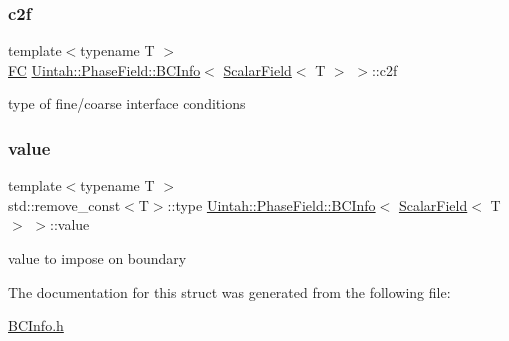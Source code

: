 \mbox{\label{structUintah_1_1PhaseField_1_1BCInfo_3_01ScalarField_3_01T_01_4_01_4_a6418f823c0e3c123aaacc573b04cb5ff}} 
\subsubsection{\texorpdfstring{c2f}{c2f}}
{\footnotesize\ttfamily template$<$typename T $>$ \\
\hyperlink{namespaceUintah_1_1PhaseField_aeb51fe956fe07f1487f5878f4039f27c}{FC} \hyperlink{structUintah_1_1PhaseField_1_1BCInfo}{Uintah\+::\+Phase\+Field\+::\+B\+C\+Info}$<$ \hyperlink{structUintah_1_1PhaseField_1_1ScalarField}{Scalar\+Field}$<$ T $>$ $>$\+::c2f}



type of fine/coarse interface conditions 

\mbox{\label{structUintah_1_1PhaseField_1_1BCInfo_3_01ScalarField_3_01T_01_4_01_4_a5966d1046d646fa0bf0a2abbff927ce6}} 
\subsubsection{\texorpdfstring{value}{value}}
{\footnotesize\ttfamily template$<$typename T $>$ \\
std\+::remove\+\_\+const$<$T$>$\+::type \hyperlink{structUintah_1_1PhaseField_1_1BCInfo}{Uintah\+::\+Phase\+Field\+::\+B\+C\+Info}$<$ \hyperlink{structUintah_1_1PhaseField_1_1ScalarField}{Scalar\+Field}$<$ T $>$ $>$\+::value}



value to impose on boundary 



The documentation for this struct was generated from the following file\+:\begin{DoxyCompactItemize}
\item 
\hyperlink{BCInfo_8h}{B\+C\+Info.\+h}\end{DoxyCompactItemize}
